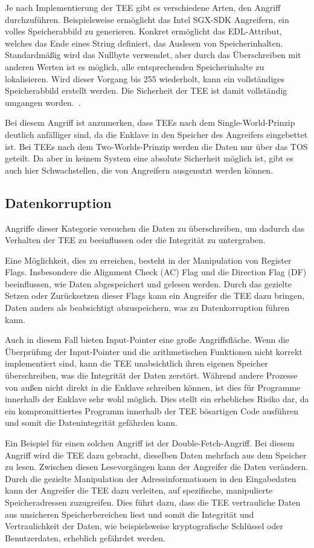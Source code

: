 Je nach Implementierung der TEE gibt es verschiedene Arten, den Angriff durchzuführen. Beispielsweise ermöglicht das Intel SGX-SDK Angreifern, ein volles Speicherabbild zu generieren. Konkret ermöglicht das EDL-Attribut, welches das Ende eines String definiert, das Auslesen von Speicherinhalten. Standardmäßig wird das Nullbyte verwendet, aber durch das Überschreiben mit anderen Werten ist es möglich, alle entsprechenden Speicherinhalte zu lokalisieren. Wird dieser Vorgang bis 255 wiederholt, kann ein vollständiges Speicherabbild erstellt werden. Die Sicherheit der TEE ist damit vollständig umgangen worden.~\cite{IntelSGX, TEEPaper}.

Bei diesem Angriff ist anzumerken, dass TEEs nach dem Single-World-Prinzip deutlich anfälliger sind, da die Enklave in den Speicher des Angreifers eingebettet ist. Bei TEEs nach dem Two-Worlds-Prinzip werden die Daten nur über das TOS geteilt. Da aber in keinem System eine absolute Sicherheit möglich ist, gibt es auch hier Schwachstellen, die von Angreifern ausgenutzt werden können.

\subsection{Datenkorruption}
Angriffe dieser Kategorie versuchen die Daten zu überschreiben, um dadurch das Verhalten der TEE zu beeinflussen oder die Integrität zu untergraben.

Eine Möglichkeit, dies zu erreichen, besteht in der Manipulation von Register Flags. Insbesondere die Alignment Check (AC) Flag und die Direction Flag (DF) beeinflussen, wie Daten abgespeichert und gelesen werden. Durch das gezielte Setzen oder Zurücksetzen dieser Flags kann ein Angreifer die TEE dazu bringen, Daten anders als beabsichtigt abzuspeichern, was zu Datenkorruption führen kann.

Auch in diesem Fall bieten Input-Pointer eine große Angriffsfläche. Wenn die Überprüfung der Input-Pointer und die arithmetischen Funktionen nicht korrekt implementiert sind, kann die TEE unabsichtlich ihren eigenen Speicher überschreiben, was die Integrität der Daten zerstört. Während andere Prozesse von außen nicht direkt in die Enklave schreiben können, ist dies für  Programme innerhalb der Enklave sehr wohl möglich. Dies stellt ein erhebliches Risiko dar, da ein kompromittiertes Programm innerhalb der TEE bösartigen Code ausführen und somit die Datenintegrität gefährden kann.


Ein Beispiel für einen solchen Angriff ist der Double-Fetch-Angriff. Bei diesem Angriff wird die TEE dazu gebracht, dieselben Daten mehrfach aus dem Speicher zu lesen. Zwischen diesen Lesevorgängen kann der Angreifer die Daten verändern. Durch die gezielte Manipulation der Adressinformationen in den Eingabedaten kann der Angreifer die TEE dazu verleiten, auf spezifische, manipulierte Speicheradressen zuzugreifen. Dies führt dazu, dass die TEE vertrauliche Daten aus unsicheren Speicherbereichen liest und somit die Integrität und Vertraulichkeit der Daten, wie beispielsweise kryptografische Schlüssel oder Benutzerdaten, erheblich gefährdet werden.

